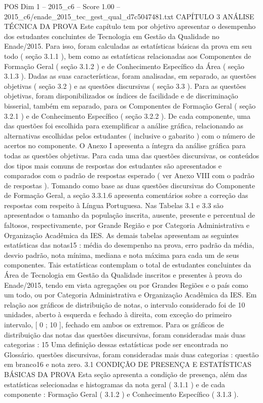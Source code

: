 \begin{textsample}{POS Dim 1 – 2015\_c6 – Score 1.00 – 2015\_c6/enade\_2015\_tec\_gest\_qual\_d7c5047481.txt}  \label{ex:f1_pos_159}
CAPÍTULO 3 ANÁLISE TÉCNICA DA PROVA Este capítulo tem por objetivo apresentar o desempenho dos estudantes concluintes de Tecnologia em Gestão da Qualidade no Enade/2015.
Para isso, foram calculadas as estatísticas básicas da prova em seu todo ( seção 3.1.1 ), bem como as estatísticas relacionadas aos Componentes de Formação Geral ( seção 3.1.2 ) e de Conhecimento Específico da Área ( seção 3.1.3 ).
Dadas as suas características, foram analisadas, em separado, as questões objetivas ( seção 3.2 ) e as questões discursivas ( seção 3.3 ).
Para as questões objetivas, foram disponibilizados os índices de facilidade e de discriminação bisserial, também em separado, para os Componentes de Formação Geral ( seção 3.2.1 ) e de Conhecimento Específico ( seção 3.2.2 ).
De cada componente, uma das questões foi escolhida para exemplificar a análise gráfica, relacionando as alternativas escolhidas pelos estudantes ( inclusive o gabarito ) com o número de acertos no componente.
O Anexo I apresenta a íntegra da análise gráfica para todas as questões objetivas.
Para cada uma das questões discursivas, os conteúdos dos tipos mais comuns de respostas dos estudantes são apresentados e comparados com o padrão de respostas esperado ( ver Anexo VIII com o padrão de respostas ).
Tomando como base as duas questões discursivas do Componente de Formação Geral, a seção 3.3.1.6 apresenta comentários sobre a correção das respostas com respeito à Língua Portuguesa.
Nas Tabelas 3.1 e 3.3 são apresentados o tamanho da população inscrita, ausente, presente e percentual de faltosos, respectivamente, por Grande Região e por Categoria Administrativa e Organização Acadêmica da IES.
As demais tabelas apresentam as seguintes estatísticas das notas15 : média do desempenho na prova, erro padrão da média, desvio padrão, nota mínima, mediana e nota máxima para cada um de seus componentes.
Tais estatísticas contemplam o total de estudantes concluintes da Área de Tecnologia em Gestão da Qualidade inscritos e presentes à prova do Enade/2015, tendo em vista agregações ou por Grandes Regiões e o país como um todo, ou por Categoria Administrativa e Organização Acadêmica da IES.
Em relação aos gráficos de distribuição de notas, o intervalo considerado foi de 10 unidades, aberto à esquerda e fechado à direita, com exceção do primeiro intervalo, [ 0 ; 10 ], fechado em ambos os extremos.
Para os gráficos de distribuição das notas das questões discursivas, foram consideradas mais duas categorias : 15 Uma definição dessas estatísticas pode ser encontrada no Glossário. questões discursivas, foram consideradas mais duas categorias : questão em branco16 e nota zero. 3.1 CONDIÇÃO DE PRESENÇA E ESTATÍSTICAS BÁSICAS DA PROVA Esta seção apresenta a condição de presença, além das estatísticas selecionadas e histogramas da nota geral ( 3.1.1 ) e de cada componente : Formação Geral ( 3.1.2 ) e Conhecimento Específico ( 3.1.3 ).

\end{textsample}

